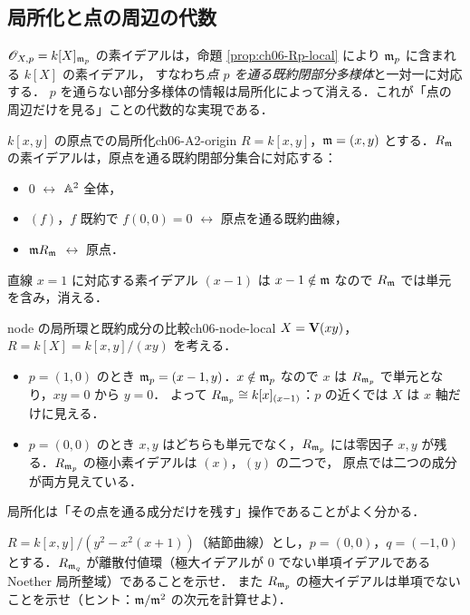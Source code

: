 \subsection{局所化と点の周辺の代数}

$\mathscr{O}_{X,p}=k[X]_{\mathfrak{m}_p}$ の素イデアルは，命題 \ref{prop:ch06-Rp-local} により $\mathfrak{m}_p$ に含まれる $k[X]$ の素イデアル，
すなわち\emph{点 $p$ を通る既約閉部分多様体}と一対一に対応する．
$p$ を通らない部分多様体の情報は局所化によって消える．これが「点の周辺だけを見る」ことの代数的な実現である．

\begin{myex}{$k[x,y]$ の原点での局所化}{ch06-A2-origin}
$R=k[x,y]$，$\mathfrak{m}=(x,y)$ とする．$R_{\mathfrak{m}}$ の素イデアルは，原点を通る既約閉部分集合に対応する：
\begin{itemize}
  \item $0$ $\leftrightarrow$ $\mathbb{A}^2$ 全体，
  \item $(f)$，$f$ 既約で $f(0,0)=0$ $\leftrightarrow$ 原点を通る既約曲線，
  \item $\mathfrak{m} R_{\mathfrak{m}}$ $\leftrightarrow$ 原点．
\end{itemize}
直線 $x=1$ に対応する素イデアル $(x-1)$ は $x-1\notin\mathfrak{m}$ なので $R_{\mathfrak{m}}$ では単元を含み，消える．
\end{myex}

\begin{myex}{node の局所環と既約成分の比較}{ch06-node-local}
$X=\mathbf{V}(xy)$，$R=k[X]=k[x,y]/(xy)$ を考える．
\begin{itemize}
  \item $p=(1,0)$ のとき $\mathfrak{m}_p=(x-1,y)$．$x\notin\mathfrak{m}_p$ なので $x$ は $R_{\mathfrak{m}_p}$ で単元となり，$xy=0$ から $y=0$．
        よって $R_{\mathfrak{m}_p}\cong k[x]_{(x-1)}$：$p$ の近くでは $X$ は $x$ 軸だけに見える．
  \item $p=(0,0)$ のとき $x,y$ はどちらも単元でなく，$R_{\mathfrak{m}_p}$ には零因子 $x,y$ が残る．$R_{\mathfrak{m}_p}$ の極小素イデアルは $(x)$，$(y)$ の二つで，
        原点では二つの成分が両方見えている．
\end{itemize}
局所化は「その点を通る成分だけを残す」操作であることがよく分かる．
\end{myex}

$R=k[x,y]/(y^2-x^2(x+1))$（結節曲線）とし，$p=(0,0)$，$q=(-1,0)$ とする．$R_{\mathfrak{m}_q}$ が離散付値環（極大イデアルが $0$ でない単項イデアルである Noether 局所整域）であることを示せ．
また $R_{\mathfrak{m}_p}$ の極大イデアルは単項でないことを示せ（ヒント：$\mathfrak{m}/\mathfrak{m}^2$ の次元を計算せよ）．

